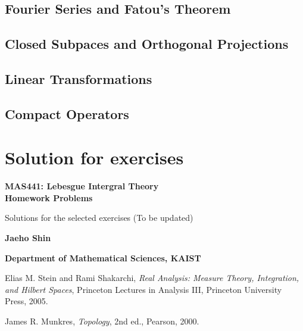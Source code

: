 \documentclass[12pt, a4paper, openany, twoside]{book}
\theoremstyle{definition}
\theoremstyle{remark}
\theoremstyle{plain}
\numberwithin{equation}{section}
\begin{document}
\section{Fourier Series and Fatou's Theorem}
\section{Closed Subpaces and Orthogonal Projections}
\section{Linear Transformations}
\section{Compact Operators}

\newpage
\chapter{Solution for exercises}
\begin{center}
    \vspace*{4cm}
        
    \Huge
    \textbf{MAS441: Lebesgue Intergral Theory\\\vspace{2mm}
    Homework Problems}

    \vspace{1cm}
    \large
    Solutions for the selected exercises (To be updated)
    \vspace{3cm}
    
    \LARGE
    \textbf{Jaeho Shin}
        
    \vspace{5cm}
        
    \normalsize
    \textbf{Department of Mathematical Sciences, KAIST}\\  
\end{center}

\newpage

\begin{thebibliography}{99}

Elias M. Stein and Rami Shakarchi,
\textit{Real Analysis: Measure Theory, Integration, and Hilbert Spaces},
Princeton Lectures in Analysis III, Princeton University Press, 2005.

James R. Munkres,  
\textit{Topology},  
2nd ed., Pearson, 2000.

\end{thebibliography}
\end{document}
